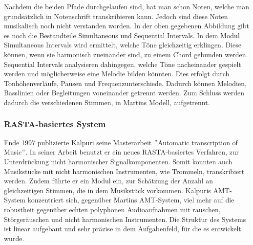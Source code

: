 Nachdem die beiden Pfade durchgelaufen sind, hat man schon Noten,
welche man grundsätzlich in Notenschrift transkribieren kann.
Jedoch sind diese Noten musikalisch noch nicht verstanden worden.
In der oben gegebenen Abbildung gibt es noch die Bestandteile Simultaneous und Sequential Intervals.
In dem Modul Simultaneous Intervals wird ermittelt, welche Töne gleichzeitig erklingen.
Diese können, wenn sie harmonisch zueinander sind, zu einem Chord gebunden werden.
Sequential Intervals analysieren dahingegen, welche Töne nacheinander gespielt werden und
möglicherweise eine Melodie bilden könnten.
Dies erfolgt durch Tonhöhenverläufe, Pausen und Frequenzunterschiede.
Dadurch können Melodien, Basslinien oder Begleitungen voneinander getrennt werden.
Zum Schluss werden dadurch die verschiedenen Stimmen, in Martins Modell, aufgetrennt.

\subsubsection{RASTA-basiertes System}
Ende 1997 publizierte Kalpuri seine Masterarbeit \("\)Automatic transcription of Music\("\).
\cite{klapuri1998automatic}
In seiner Arbeit benutzt er ein neues RASTA-basiertes Verfahren, zur Unterdrückung nicht harmonischer Signalkomponenten.
Somit konnten auch Musikstücke mit nicht harmonischen Instrumenten, wie Trommeln, transkribiert werden.
Zudem führte er ein Modul ein, zur Schätzung der Anzahl an gleichzeitigen Stimmen, die in dem Musikstück vorkommen.
Kalpuris AMT-System konzentriert sich, gegenüber Martins AMT-System, viel mehr auf die robustheit gegenüber
echten polyphonen Audioaufnahmen mit rauschen, Störgeräuschen und nicht harmonischen Instrumenten.
Die Struktur des Systems ist linear aufgebaut und sehr präzise in dem Aufgabenfeld, für die es entwickelt wurde.

\begin{center}
    \vspace{1em}
    \vspace{1em}
\end{center}

